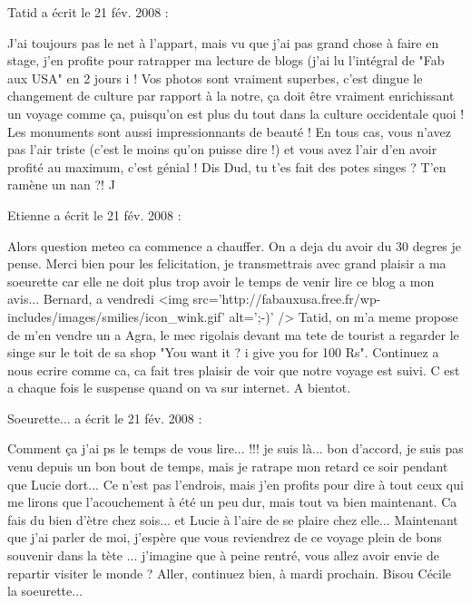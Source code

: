 \medskip
Tatid a écrit le 21 fév. 2008 :
\begin{displayquote}
J'ai toujours pas le net à l'appart, mais vu que j'ai pas grand chose à faire en stage, j'en profite pour ratrapper ma lecture de blogs (j'ai lu l'intégral de "Fab aux USA" en 2 jours ^^) !
Vos photos sont vraiment superbes, c'est dingue le changement de culture par rapport à la notre, ça doit être vraiment enrichissant un voyage comme ça, puisqu'on est plus du tout dans la culture occidentale quoi ! Les monuments sont aussi impressionnants de beauté ! En tous cas, vous n'avez pas l'air triste (c'est le moins qu'on puisse dire !) et vous avez l'air d'en avoir profité au maximum, c'est génial !
Dis Dud, tu t'es fait des potes singes ? T'en ramène un nan ?! ^^
\end{displayquote}

\medskip
Etienne a écrit le 21 fév. 2008 :
\begin{displayquote}
Alors question meteo ca commence a chauffer. On a deja du avoir du 30 degres je pense. Merci bien pour les felicitation, je transmettrais avec grand plaisir a ma soeurette car elle ne doit plus trop avoir le temps de venir lire ce blog a mon avis...
Bernard, a vendredi <img src='http://fabauxusa.free.fr/wp-includes/images/smilies/icon_wink.gif' alt=';-)' />
Tatid, on m'a meme propose de m'en vendre un a Agra, le mec rigolais devant ma tete de tourist a regarder le singe sur le toit de sa shop "You want it ? i give you for 100 Rs".
Continuez a nous ecrire comme ca, ca fait tres plaisir de voir que notre voyage est suivi. C est a chaque fois le suspense quand on va sur internet. A bientot.
\end{displayquote}

\medskip
Soeurette... a écrit le 21 fév. 2008 :
\begin{displayquote}
Comment ça j'ai ps le temps de vous lire... !!! je suis là... bon d'accord, je suis pas venu depuis un bon bout de temps, mais je ratrape mon retard ce soir pendant que Lucie dort...
Ce n'est pas l'endrois, mais j'en profits pour dire à tout ceux  qui me lirons que l'acouchement à été un peu dur, mais tout va bien maintenant. Ca fais du bien d'ètre chez sois... et Lucie à l'aire de se plaire chez elle...
Maintenant que j'ai parler de moi, j'espère que vous reviendrez de ce voyage plein de bons souvenir dans la tète ... j'imagine que à peine rentré, vous allez avoir envie de repartir visiter le monde ?
Aller, continuez bien, à mardi prochain.
Bisou
Cécile la soeurette...
\end{displayquote}

